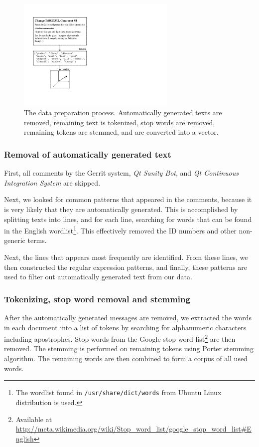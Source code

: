 \documentclass[conference]{IEEEtran}
\begin{document}
\begin{figure}[h]
\centering
\includegraphics[width=3in]{preprocess}
\caption{The data preparation process.
Automatically generated texts are removed, remaining text is tokenized, stop words are removed, remaining tokens are stemmed,
and are converted into a vector.}
\label{fig:preprocess}
\end{figure}

\subsubsection{Removal of automatically generated text}

First, all comments by the Gerrit system, \emph{Qt Sanity Bot}, and \emph{Qt Continuous Integration System} are skipped.

Next, we looked for common patterns that appeared in the comments, because it is very likely that they are automatically generated.
This is accomplished by splitting texts into lines, and for each line, searching for words that can be found in the English wordlist\footnote{The wordlist found in \texttt{/usr/share/dict/words} from Ubuntu Linux distribution is used.}.
This effectively removed the ID numbers and other non-generic terms.

Next, the lines that appears most frequently are identified.
From these lines, we then constructed the regular expression patterns,
and finally, these patterns are used to filter out automatically generated text from our data.

\subsubsection{Tokenizing, stop word removal and stemming}

After the automatically generated messages are removed, we extracted the words in each document into a list of tokens by searching for alphanumeric characters including apostrophes.
Stop words from the Google stop word list\footnote{Available at \url{http://meta.wikimedia.org/wiki/Stop_word_list/google_stop_word_list#English}} are then removed.
The stemming is performed on remaining tokens using Porter stemming algorithm.
The remaining words are then combined to form a corpus of all used words.
\end{document}
